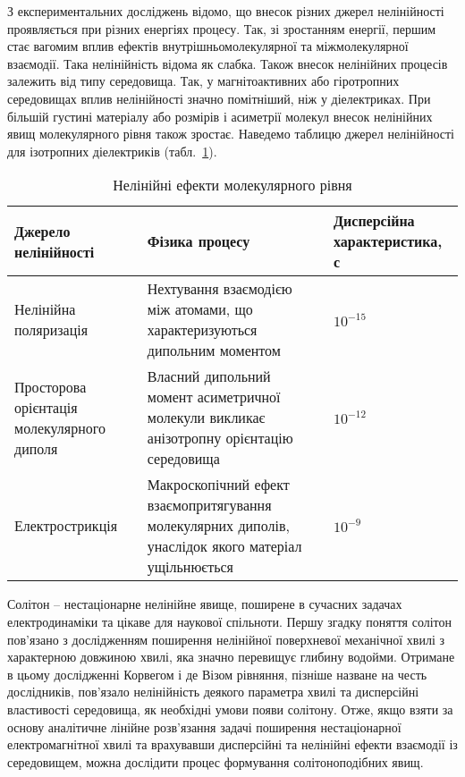 З експериментальних досліджень відомо, що внесок різних джерел нелінійності 
проявляється при різних енергіях процесу. Так, зі зростанням енергії, першим 
стає вагомим вплив ефектів внутрішньомолекулярної та міжмолекулярної 
взаємодії. Така нелінійність відома як слабка. Також внесок нелінійних процесів
залежить від типу середовища. Так, у магнітоактивних або гіротропних 
середовищах вплив нелінійності значно помітніший, ніж у діелектриках. 
При більшій густині матеріалу або розмірів і асиметрії молекул внесок нелінійних 
явищ молекулярного рівня також зростає. Наведемо таблицю джерел нелінійності 
для ізотропних діелектриків (табл.~\ref{tab:molecular_nonlinear}).
 

\begin{table}
\caption{Нелінійні ефекти молекулярного рівня} 
\label{tab:molecular_nonlinear}
\centering
\begin{tabular}{ |p{4.2cm}|p{5.6cm}|p{4.6cm}| } 
	
	\hline
	Джерело нелінійності & Фізика процесу & Дисперсійна характеристика, с  \\ 
	
	\hline
	Нелінійна поляризація & 
	Нехтування взаємодією між атомами, що характеризуються дипольним моментом & 
	$ 10^{-15} $  \\  
	
	\hline
	Просторова орієнтація молекулярного диполя & 
	Власний дипольний момент асиметричної молекули викликає анізотропну 
	орієнтацію середовища & 
	$ 10^{-12} $  \\  
	
	\hline
	Електрострикція & 
	Макроскопічний ефект взаємопритягування молекулярних диполів, унаслідок
	якого матеріал ущільнюється  & 
	$ 10^{-9} $  \\  
	
	\hline
\end{tabular}
\end{table}

\vspace{8mm}
Солітон -- нестаціонарне нелінійне явище, поширене в сучасних 
задачах електродинаміки та цікаве для наукової спільноти. Першу згадку поняття 
солітон пов’язано з дослідженням поширення нелінійної поверхневої 
механічної хвилі з характерною довжиною хвилі, яка значно перевищує глибину 
водойми. Отримане в цьому дослідженні Корвегом і де Візом рівняння, пізніше 
назване на честь дослідників, пов'язало нелінійність деякого параметра хвилі 
та дисперсійні властивості середовища, як необхідні умови появи солітону.
Отже, якщо взяти за основу аналітичне лінійне розв'язання задачі поширення 
нестаціонарної електромагнітної хвилі та врахувавши дисперсійні та нелінійні 
ефекти взаємодії із середовищем, можна дослідити процес формування 
солітоноподібних явищ.

